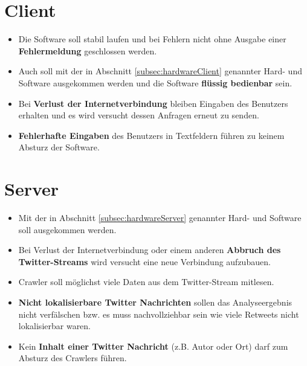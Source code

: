
\section{Client}
\begin{itemize}
	\item Die Software soll stabil laufen und bei Fehlern nicht ohne Ausgabe einer \textbf{Fehlermeldung} geschlossen werden.
	\item Auch soll mit der in Abschnitt \ref{subsec:hardwareClient} genannter Hard- und Software ausgekommen werden und die Software \textbf{flüssig bedienbar} sein.
	\item Bei \textbf{Verlust der Internetverbindung} bleiben Eingaben des Benutzers erhalten und es wird versucht dessen Anfragen erneut zu senden.
	\item \textbf{Fehlerhafte Eingaben} des Benutzers in Textfeldern führen zu keinem Absturz der Software.
\end{itemize}
\section{Server}
\begin{itemize}
	\item Mit der in Abschnitt \ref{subsec:hardwareServer} genannter Hard- und Software soll ausgekommen werden.
	\item Bei Verlust der Internetverbindung oder einem anderen \textbf{Abbruch des Twitter-Streams} wird versucht eine neue Verbindung aufzubauen.
	\item Crawler soll möglichst viele Daten aus dem Twitter-Stream mitlesen.
	\item \textbf{Nicht lokalisierbare Twitter Nachrichten} sollen das Analyseergebnis nicht verfälschen bzw. es muss nachvollziehbar sein wie viele Retweets nicht lokalisierbar waren.
	\item Kein \textbf{Inhalt einer Twitter Nachricht} (z.B. Autor oder Ort) darf zum Absturz des Crawlers führen.
\end{itemize}
